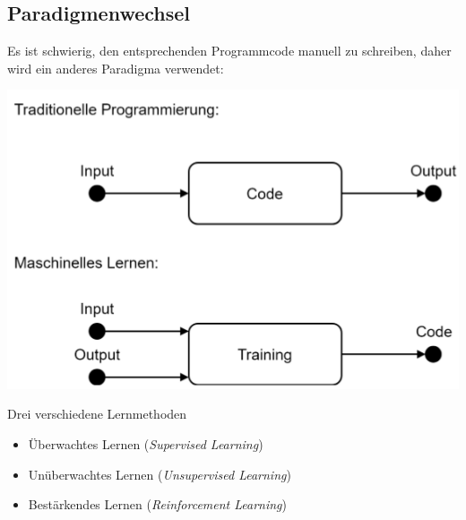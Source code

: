 \documentclass{report}
\begin{document}
\subsection{Paradigmenwechsel}
Es ist schwierig, den entsprechenden Programmcode manuell zu schreiben, daher wird ein anderes Paradigma verwendet:
\begin{center}
  \includegraphics[scale=.4]{ml01_2}
\end{center}
Drei verschiedene Lernmethoden
\begin{itemize}
  \item Überwachtes Lernen (\textit{Supervised Learning})
  \item Unüberwachtes Lernen (\textit{Unsupervised Learning})
  \item Bestärkendes Lernen (\textit{Reinforcement Learning})
\end{itemize}
\end{document}
